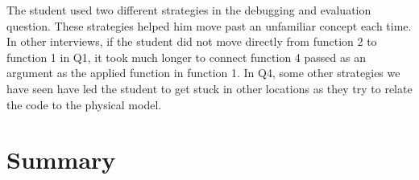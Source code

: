 \documentclass{article}
\begin{document}
The student used two different strategies in the debugging and evaluation question. These strategies helped him move past an unfamiliar concept each time. In other interviews, if the student did not move directly from function 2 to function 1 in Q1, it took much longer to connect function 4 passed as an argument as the applied function in function 1. In Q4, some other strategies we have seen have led the student to get stuck in other locations as they try to relate the code to the physical model. 







\section{Summary}
\end{document}
